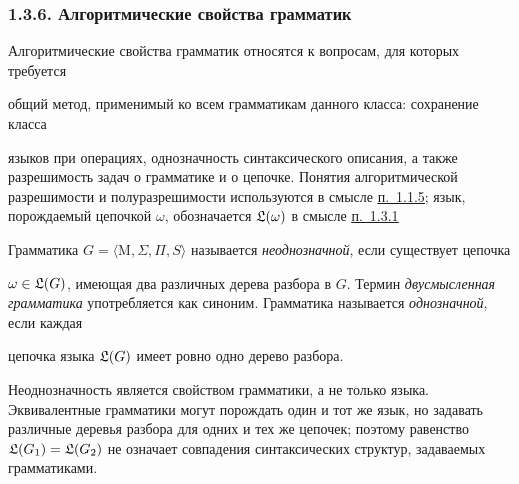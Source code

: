 \documentclass[mathserif,12pt,aspectratio=169]{beamer}
\renewcommand{\index}[1]{}
\def\odmkey#1#2{{\it\color{red} #1}\index{#2}}
\def\DMref#1#2{{\color{blue}\underline{\hyperlink{#2}{#1}}}}
\begin{document}
\begin{frame}[t]
	\frametitle{1.3.6. Алгоритмические свойства грамматик }
	\setlength{\parskip}{1pt}
	\sloppy
	
	Алгоритмические свойства грамматик относятся к вопросам, для которых требуется
	
	общий метод, применимый ко всем грамматикам данного класса: сохранение класса 
	
	языков при операциях, однозначность синтаксического описания, а также разрешимость задач о грамматике и о цепочке. Понятия алгоритмической разрешимости и полуразрешимости используются в смысле \DMref{п.~1.1.5}{1.1.5.}; язык, порождаемый цепочкой $\omega$, обозначается $\frak{L}(\omega)$ в смысле \DMref{п.~1.3.1}{1.3.1.}
	
	
	Грамматика $G=\langle \mathrm{M}, \Sigma, \Pi, S \rangle$ называется \odmkey{неоднозначной}{Грамматика!неоднозначная}, если существует цепочка 
	
	$\omega\in\frak{L}(G)$, имеющая два различных дерева разбора в $G$. Термин \odmkey{двусмысленная грамматика}{Грамматика!двусмысленная} употребляется как синоним. Грамматика называется \odmkey{однозначной}{Грамматика!однозначная}, если каждая 
	
	цепочка языка $\frak{L}(G)$ имеет ровно одно дерево разбора.
	
	
	Неоднозначность является свойством грамматики, а не только языка. Эквивалентные грамматики могут порождать один и тот же язык, но задавать различные деревья разбора для одних и тех же цепочек; поэтому равенство $\frak{L}(G_1)=\frak{L}(G_2)$ не означает совпадения синтаксических структур, задаваемых грамматиками.
\end{frame}
\end{document}
